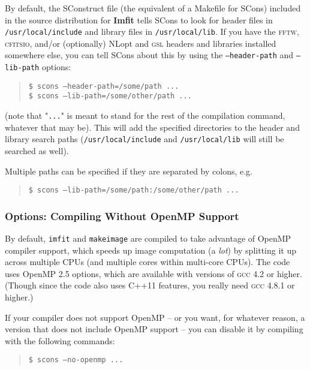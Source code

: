 \documentclass[10pt,a4paper,article]{memoir}
\newcommand{\imfit}{\textbf{Imfit}}
\newcommand{\imfitprog}{\texttt{imfit}}
\newcommand{\makeimage}{\texttt{makeimage}}
\begin{document}
By default, the SConstruct file (the equivalent of a Makefile for SCons) included
in the source distribution for \imfit{}
tells SCons to look for header files in \texttt{/usr/local/include} and
library files in \texttt{/usr/local/lib}. If you have the \textsc{fftw},
\textsc{cfitsio}, and/or (optionally) NLopt and \textsc{gsl} headers and
libraries installed somewhere else, you can tell SCons about this by
using the
\texttt{--header-path} and \texttt{--lib-path} options:
\begin{quote}
\texttt{\$ scons --header-path=/some/path ...} \\
\texttt{\$ scons --lib-path=/some/other/path ...}
\end{quote}
(note that "\texttt{...}" is meant to stand for the rest of the compilation command,
whatever that may be). This will add the specified directories to the
header and library search paths (\texttt{/usr/local/include} and \texttt{/usr/local/lib}
will still be searched as well).

Multiple paths can be specified if they are separated by colons, e.g.
\begin{quote}
\texttt{\$ scons --lib-path=/some/path:/some/other/path ...} \\
\end{quote}



\subsubsection{Options: Compiling Without OpenMP Support}

By default, \imfitprog{} and \makeimage{} are compiled to take advantage
of OpenMP compiler support, which speeds up image computation (a
\textit{lot}) by splitting it up across multiple CPUs (and multiple
cores within multi-core CPUs). The code uses OpenMP 2.5 options, which
are available with versions of \textsc{gcc} 4.2 or higher. (Though since
the code also uses C++11 features, you really need \textsc{gcc} 4.8.1 or
higher.)

If your compiler
does not support OpenMP -- or you want, for whatever reason, a version
that does not include OpenMP support -- you can disable it by compiling
with the following commands:
\begin{quote}
\texttt{\$ scons --no-openmp ...}
\end{quote}
\end{document}
